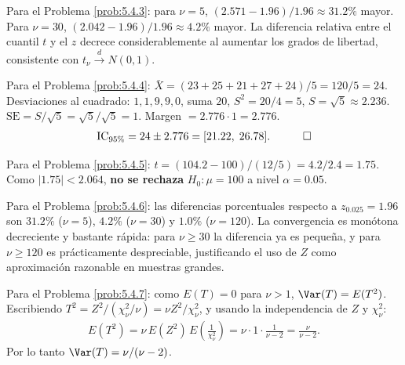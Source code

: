 \begin{solucion}
	\label{sol:5.4.3}
	Para el Problema \ref{prob:5.4.3}: para $\nu=5$, $(2.571-1.96)/1.96 \approx 31.2\%$ mayor. Para $\nu=30$, $(2.042-1.96)/1.96\approx 4.2\%$ mayor. La diferencia relativa entre el cuantil $t$ y el $z$ decrece considerablemente al aumentar los grados de libertad, consistente con $t_\nu\xrightarrow{d}N(0,1)$. \quad \qedhere
\end{solucion}

\begin{solucion}
	\label{sol:5.4.4}
	Para el Problema \ref{prob:5.4.4}: $\bar X = (23+25+21+27+24)/5 = 120/5 = 24$. Desviaciones al cuadrado: $1,1,9,9,0$, suma $20$, $S^2=20/4=5$, $S=\sqrt5\approx 2.236$. $\text{SE}=S/\sqrt5 = \sqrt5/\sqrt5=1$. Margen $=2.776\cdot 1=2.776$.
	\begin{align*}
		\text{IC}_{95\%} = 24 \pm 2.776 = [21.22,\; 26.78]. \quad \qedhere
	\end{align*}
\end{solucion}

\begin{solucion}
	\label{sol:5.4.5}
	Para el Problema \ref{prob:5.4.5}: $t = (104.2-100)/(12/5) = 4.2/2.4 = 1.75$. Como $|1.75| < 2.064$, \textbf{no se rechaza} $H_0:\mu=100$ a nivel $\alpha=0.05$. \quad \qedhere
\end{solucion}

\begin{solucion}
	\label{sol:5.4.6}
	Para el Problema \ref{prob:5.4.6}: las diferencias porcentuales respecto a $z_{0.025}=1.96$ son $31.2\%$ ($\nu=5$), $4.2\%$ ($\nu=30$) y $1.0\%$ ($\nu=120$). La convergencia es mon\'otona decreciente y bastante rápida: para $\nu\ge 30$ la diferencia ya es pequeña, y para $\nu\ge 120$ es prácticamente despreciable, justificando el uso de $Z$ como aproximación razonable en muestras grandes. \quad \qedhere
\end{solucion}

\begin{solucion}
	\label{sol:5.4.7}
	Para el Problema \ref{prob:5.4.7}: como $E(T)=0$ para $\nu>1$, $\Var(T)=E(T^2)$. Escribiendo $T^2 = Z^2/(\chi^2_\nu/\nu) = \nu Z^2/\chi^2_\nu$, y usando la independencia de $Z$ y $\chi^2_\nu$:
	\begin{align*}
		E(T^2) = \nu\, E(Z^2)\, E\!\left(\frac{1}{\chi^2_\nu}\right) = \nu \cdot 1 \cdot \frac{1}{\nu-2} = \frac{\nu}{\nu-2}.
	\end{align*}
	Por lo tanto $\Var(T) = \nu/(\nu-2)$. \quad \qedhere
\end{solucion}

